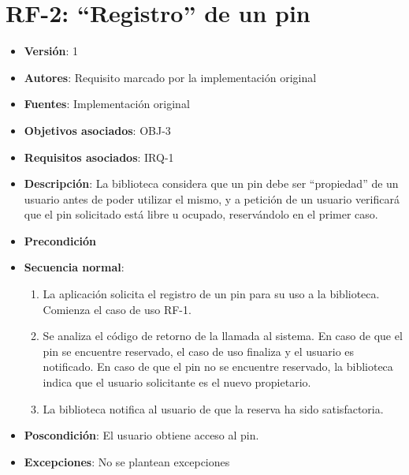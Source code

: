 \documentclass[letterpaper,10pt,spanish]{sphinxmanual}
\begin{document}
\section{RF-2: ``Registro'' de un pin}
\label{analysis/fr:rf-2-registro-de-un-pin}\begin{itemize}
\item {} 
\textbf{Versión}: 1

\item {} 
\textbf{Autores}: Requisito marcado por la implementación original

\item {} 
\textbf{Fuentes}: Implementación original

\item {} 
\textbf{Objetivos asociados}: OBJ-3

\item {} 
\textbf{Requisitos asociados}: IRQ-1

\item {} 
\textbf{Descripción}: La biblioteca considera que un pin debe ser ``propiedad'' de un usuario antes de poder utilizar el mismo, y a petición de un usuario verificará que el pin solicitado está libre u ocupado, reservándolo en el primer caso.

\item {} 
\textbf{Precondición}

\item {} 
\textbf{Secuencia normal}:
\begin{enumerate}
\item {} 
La aplicación solicita el registro de un pin para su uso a la biblioteca. Comienza el caso de uso RF-1.

\item {} 
Se analiza el código de retorno de la llamada al sistema. En caso de que el pin se encuentre reservado, el caso de uso finaliza y el usuario es notificado. En caso de que el pin no se encuentre reservado, la biblioteca indica que el usuario solicitante es el nuevo propietario.

\item {} 
La biblioteca notifica al usuario de que la reserva ha sido satisfactoria.

\end{enumerate}

\item {} 
\textbf{Poscondición}: El usuario obtiene acceso al pin.

\item {} 
\textbf{Excepciones}: No se plantean excepciones


\end{itemize}
\end{document}
